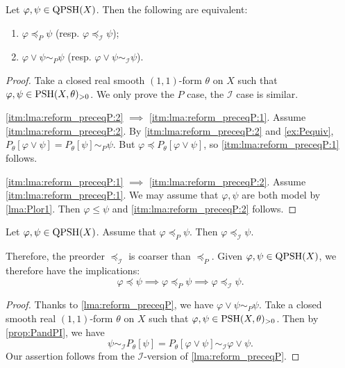 \begin{lemma}\label{lma:reform_preceqP}
    Let $\varphi,\psi\in \mathrm{QPSH}(X)$. Then the following are equivalent:
    \begin{enumerate}
        \item\label{itm:lma:reform_preceqP:1} $\varphi\preceq_P \psi$ (resp. $\varphi\preceq_{\mathcal{I}} \psi$);
        \item\label{itm:lma:reform_preceqP:2} $\varphi\lor \psi\sim_P\psi$ (resp. $\varphi\lor \psi\sim_{\mathcal{I}}\psi$).
    \end{enumerate}
\end{lemma}
\begin{proof}
Take a closed real smooth $(1,1)$-form $\theta$ on $X$ such that $\varphi,\psi\in \mathrm{PSH}(X,\theta)_{>0}$. We only prove the $P$ case, the $\mathcal{I}$ case is similar.

\ref{itm:lma:reform_preceqP:2} $\implies$ \ref{itm:lma:reform_preceqP:1}. Assume \ref{itm:lma:reform_preceqP:2}. By \ref{itm:lma:reform_preceqP:2} and \cref{ex:Pequiv}, $P_{\theta}[\varphi\lor \psi]=P_{\theta}[\psi]\sim_P \psi$. But $\varphi\preceq P_{\theta}[\varphi\lor \psi]$, so \ref{itm:lma:reform_preceqP:1} follows.

\ref{itm:lma:reform_preceqP:1} $\implies$ \ref{itm:lma:reform_preceqP:2}. Assume \ref{itm:lma:reform_preceqP:1}. We may assume that $\varphi,\psi$ are both model by \cref{lma:Plor1}.
    Then $\varphi\leq \psi$ and \ref{itm:lma:reform_preceqP:2} follows.
\end{proof}

\begin{corollary}\label{cor:PimpliesI}
    Let $\varphi,\psi \in \mathrm{QPSH}(X)$. Assume that $\varphi\preceq_P \psi$. Then $\varphi\preceq_{\mathcal{I}}\psi$.
\end{corollary}
Therefore, the preorder $\preceq_{\mathcal{I}}$ is coarser than $\preceq_P$. Given $\varphi,\psi\in \mathrm{QPSH}(X)$, we therefore have the implications:
\[
\varphi\preceq \psi \implies \varphi\preceq_P \psi \implies \varphi\preceq_{\mathcal{I}} \psi.
\]
\begin{proof}
    Thanks to \cref{lma:reform_preceqP}, we have $\varphi\lor \psi\sim_P \psi$. Take a closed smooth real $(1,1)$-form $\theta$ on $X$ such that $\varphi,\psi\in \mathrm{PSH}(X,\theta)_{>0}$.
    Then by \cref{prop:PandPI}, we have
    \[
        \psi\sim_{\mathcal{I}} P_{\theta}[\psi]= P_{\theta}\left[\varphi\lor \psi\right]\sim_{\mathcal{I}} \varphi\lor \psi.
    \]
    Our assertion follows from the $\mathcal{I}$-version of \cref{lma:reform_preceqP}.
\end{proof}

